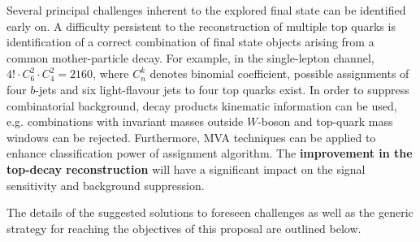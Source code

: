 \textcolor{\mycolor}{
Several principal challenges inherent to the explored final state can be identified early on. 
A difficulty persistent to the reconstruction of multiple top quarks is identification of a correct combination of final state objects arising from a common mother-particle decay. For example, in the single-lepton channel, $4!\cdot C_6^2 \cdot C_4^2 = 2160$, where $C_n^k$ denotes binomial coefficient, possible assignments of four $b$-jets and six light-flavour jets to four top quarks exist. In order to suppress combinatorial background, decay products kinematic information can be used, e.g. combinations with invariant masses outside $W$-boson and top-quark mass windows can be rejected. Furthermore, MVA techniques can be applied to enhance classification power of assignment algorithm. The \textbf{improvement in the top-decay reconstruction} will have a significant impact on the signal sensitivity and background suppression.}

\textcolor{\mycolor}{
The details of the suggested solutions to foreseen challenges as well as the generic strategy for reaching the objectives of this proposal are outlined below.}
% 
